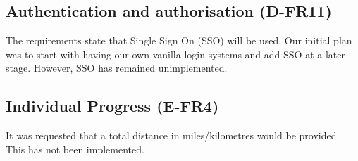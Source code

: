 \subsection{Authentication and authorisation (D-FR11)}
The requirements state that Single Sign On (SSO) will be used. Our initial plan was to start with having our own vanilla login systems and add SSO at a later stage. However, SSO has remained unimplemented. 

\subsection{Individual Progress (E-FR4)}
It was requested that a total distance in miles/kilometres would be provided. This has not been implemented.

